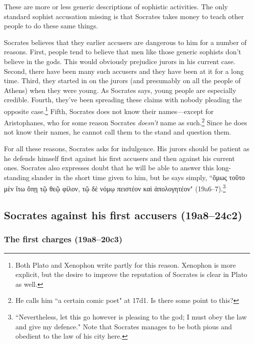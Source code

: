 \documentclass[11pt]{article}
\begin{document}
These are more or less generic descriptions of sophistic activities.  The
only standard sophist accusation missing is that Socrates takes money to
teach other people to do these same things.

Socrates believes that they earlier accusers are dangerous to him for
a number of reasons.  First, people tend to believe that men like those
generic sophists don't believe in the gods.  This would obviously prejudice
jurors in his current case.  Second, there have been many such accusers and
they have been at it for a long time.  Third, they started in on the jurors
(and presumably on all the people of Athens) when they were young.  As
Socrates says, young people are especially credible.  Fourth, they've been
spreading these claims with nobody pleading the opposite
case.\footnote{Both Plato and Xenophon write partly for this reason.
Xenophon is more explicit, but the desire to improve the reputation of
Socrates is clear in Plato as well.}  Fifth, Socrates does not know their
names---except for Aristophanes, who for some reason Socrates
\emph{doesn't} name as such.\footnote{He calls him ``a certain comic poet"
at 17d1.  Is there some point to this?}  Since he does not know their names,
he cannot call them to the stand and question them.

For all these reasons, Socrates asks for indulgence.  His jurors should be
patient as he defends himself first against his first accusers and then
against his current ones.  Socrates also expresses doubt that he will be
able to answer this long-standing slander in the short time given to him,
but he says simply, ``{\g ὅμως τοῦτο μὲν ἴτω ὅπῃ τῷ θεῷ φίλον, τῷ δὲ νόμῳ
πειστέον καὶ ἀπολογητέον}" (19a6--7).\footnote{``Nevertheless, let this go
however is pleasing to the god; I must obey the law and give my defence."
Note that Socrates manages to be both pious and obedient to the law of his
city here.}


\subsection{Socrates against his first accusers (19a8--24c2)}

\subsubsection{The first charges (19a8--20c3)}
\end{document}
